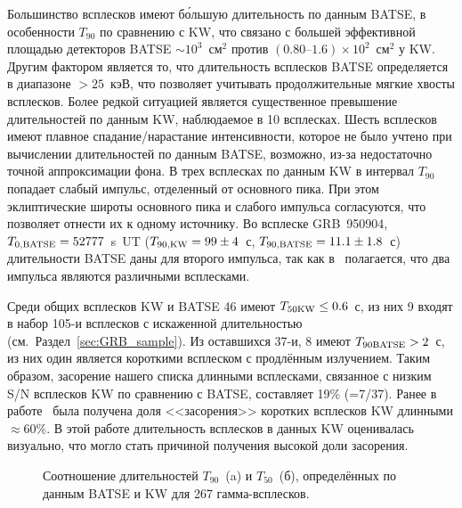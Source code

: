 Большинство всплесков имеют б\'{о}льшую длительность по данным BATSE, 
в особенности $T_{90}$ по сравнению с KW, что связано с большей  эффективной площадью детекторов 
BATSE $\sim 10^3$~см$^2$ против $(0.80\textrm{--}1.6)\times 10^2$~см$^2$ у KW. 
Другим фактором является то, что длительность всплесков BATSE определяется в 
диапазоне $>25$~кэВ, что позволяет учитывать продолжительные мягкие хвосты всплесков. 
Более редкой ситуацией является существенное превышение длительностей по данным KW, 
наблюдаемое в 10 всплесках. Шесть всплесков имеют плавное спадание/нарастание интенсивности, 
которое не было учтено при вычислении  длительностей по данным BATSE, возможно, 
из-за недостаточно точной аппроксимации фона. В трех всплесках по данным KW
в интервал $T_{90}$ попадает слабый импульс, отделенный от основного пика. 
При этом эклиптические широты основного пика и слабого импульса согласуются, 
что позволяет отнести их к одному источнику. Во всплеске GRB~950904, 
$T_{0{\mathrm{,BATSE}}} = 52777$~s~UT ($T_{90{\mathrm{,KW}}} = 99 \pm 4$~с, $T_{90{\mathrm{,BATSE}}} = 11.1\pm 1.8$~с) 
длительности BATSE даны для второго импульса, так как в~\citep{Hurley_2005} полагается, 
что два импульса являются различными всплесками.

Среди общих всплесков KW и BATSE 46 имеют $T_{50{\mathrm{KW}}} \leq 0.6$~с, 
из них 9 входят в набор 105-и всплесков с искаженной длительностью (см.~Раздел~\ref{sec:GRB_sample}). 
Из оставшихся 37-и, 8 имеют $T_{90{\mathrm{BATSE}}} > 2$~с, 
из них один является короткими всплеском с продлённым излучением. Таким образом, 
засорение нашего списка длинными всплесками, связанное с низким S/N всплесков KW
по сравнению с BATSE, составляет 19\% (=7/37). %
Ранее в работе~\citep{Ofek_2007ApJ} была получена доля 
<<засорения>> коротких всплесков KW длинными $\approx 60$\%. В этой работе
длительность всплесков в данных KW оценивалась визуально, что могло 
стать причиной получения высокой доли засорения. 

\begin{figure}[h]
  \begin{minipage}[h]{0.5\textwidth}
  \end{minipage}
  \hfill
  \begin{minipage}[h]{0.5\textwidth}
  \end{minipage}
  \caption{Соотношение длительностей $T_{90}$~(a) и $T_{50}$~(б), определённых по 
  данным BATSE и KW для 267 гамма-всплесков.}
  \label{img:T90andT50_KWvsBATSE}  
\end{figure}

